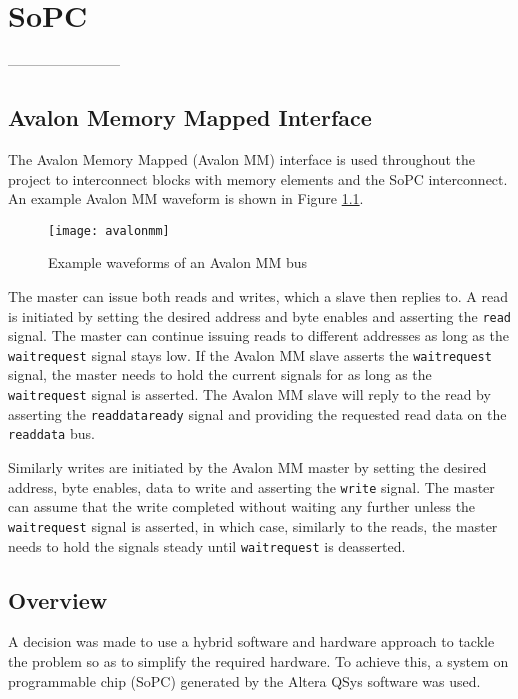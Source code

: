 \chapter{SoPC}
------------------------


\section{Avalon Memory Mapped Interface}
The Avalon Memory Mapped (Avalon MM) interface is used throughout the project to interconnect
blocks with memory elements and the SoPC interconnect. An example Avalon MM waveform
is shown in Figure \ref{figure:avalonmm}.
\begin{figure}[h!]
\begin{center}
\texttt{[image: avalonmm]}
\caption{Example waveforms of an Avalon MM bus}
\label{figure:avalonmm}
\end{center}
\end{figure}


The master can issue both reads and writes, which a slave then replies to. A read
is initiated by setting the desired address and byte enables and asserting the \texttt{read}
signal. The master can continue issuing reads to different addresses as long as the \texttt{waitrequest}
signal stays low. If the Avalon MM slave asserts the \texttt{waitrequest} signal, the master needs
to hold the current signals for as long as the \texttt{waitrequest} signal is asserted.
The Avalon MM slave will reply to the read by asserting the \texttt{readdataready} signal
and providing the requested read data on the \texttt{readdata} bus.

Similarly writes are initiated by the Avalon MM master by setting the desired address, byte enables,
data to write and asserting the \texttt{write} signal. The master can assume that the write completed
without waiting any further unless the \texttt{waitrequest} signal is asserted, in which case,
similarly to the reads, the master needs to hold the signals steady until \texttt{waitrequest} is deasserted.



\newpage
\section{Overview}
A decision was made to use a hybrid software and hardware approach to tackle the problem
so as to simplify the required hardware. To achieve this, a system on programmable chip
(SoPC) generated by the Altera QSys software was used.

